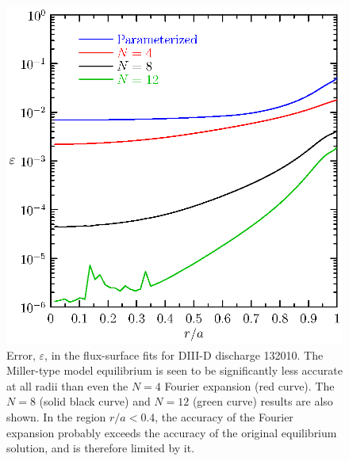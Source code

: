 \begin{figure}
\begin{center}
\includegraphics[scale=0.8]{figures/error.eps}
\caption{Error, $\varepsilon$, in the flux-surface 
fits for DIII-D discharge 132010.  The Miller-type 
model equilibrium is seen to be significantly less 
accurate at all radii than even the $N=4$ Fourier 
expansion (red curve).  The 
$N=8$ (solid black curve) and $N=12$ (green curve) 
results are also 
shown.  In the region $r/a < 0.4$, the accuracy of
the Fourier expansion probably exceeds the accuracy 
of the original equilibrium solution, and is therefore 
limited by it.}
\label{fig.error}
\end{center}
\end{figure}
%
